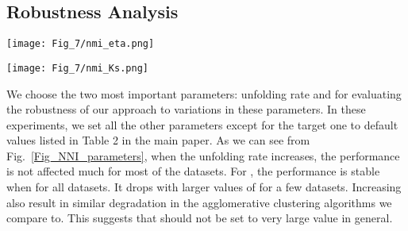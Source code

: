 \documentclass[10pt,twocolumn,letterpaper]{article}
\begin{document}
\subsection{Robustness Analysis}
\begin{figure*}[t]
\begin{minipage}{0.49\linewidth}
\centering
\texttt{[image: Fig\_7/nmi\_eta.png]}
\end{minipage}
\begin{minipage}{0.49\linewidth}
\centering
\texttt{[image: Fig\_7/nmi\_Ks.png]}
\end{minipage}
\vspace{-1pt}
\caption{Clustering performance (NMI) with different  (left) and  (right).}
\label{Fig_NNI_parameters}
\end{figure*}
We choose the two most important parameters: unfolding rate  and  for evaluating the robustness of our approach to variations in these parameters. In these experiments, we set all the other parameters except for the target one to default values listed in Table 2 in the main paper. As we can see from Fig.~\ref{Fig_NNI_parameters}, when the unfolding rate increases, the performance is not affected much for most of the datasets. For , the performance is stable when  for all datasets. It drops with larger values of  for a few datasets. Increasing  also result in similar degradation in the agglomerative clustering algorithms we compare to. This suggests that  should not be set to very large value in general.
\end{document}
